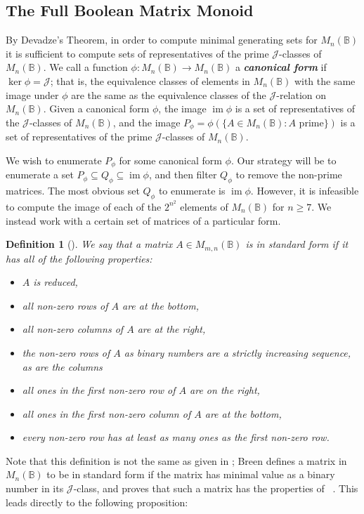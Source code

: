 \documentclass[11pt]{article}
\newtheorem*{defi}{Definition}
\newenvironment{de}[1][]{\begin{defi}[#1]\rm}{\end{defi}}
\newcommand{\defn}[1]{\textbf{\textit{#1}}}
\numberwithin{equation}{section}
\newcommand{\set}[2]{\ensuremath{\{#1 : #2 \}}}
\renewcommand{\to}{\longrightarrow}
\DeclareMathOperator{\im}{im}
\newcommand{\B}{\mathbb{B}}
\newcommand{\Bn}{M_n(\B)}
\newcommand{\Bmn}{M_{m,n}(\B)}
\newcommand{\J}{\mathscr{J}}
\begin{document}
\subsection{The Full Boolean Matrix Monoid}

By Devadze's Theorem, in order to compute minimal generating sets for $\Bn$ it
is sufficient to compute sets of representatives of the prime $\J$-classes of
$\Bn$. We call a function $\phi: \Bn \to \Bn$ a \defn{canonical form} if
$\ker\phi = \J$; that is, the equivalence classes of elements in $\Bn$ with the
same image under $\phi$ are the same as the equivalence classes of the
$\J$-relation on $\Bn$. Given a canonical form $\phi$, the image $\im\phi$ is a
set of representatives of the $\J$-classes of $\Bn$, and the image
$P_\phi = \phi(\set{A \in \Bn}{\text{$A$ prime}})$ is a set of
representatives of the prime $\J$-classes of $\Bn$. 

We wish to enumerate $P_\phi$ for some canonical form $\phi$. Our strategy will
be to enumerate a set $P_\phi \subseteq Q_\phi \subseteq \im\phi$, and then
filter $Q_\phi$ to remove the non-prime matrices.  The most obvious set
$Q_\phi$ to enumerate is $\im\phi$. However, it is infeasible to compute the
image of each of the $2^{n^2}$ elements of $\Bn$ for $n \geq 7$. We instead work
with a certain set of matrices of a particular form. 

\begin{de}[{{\cite[Proposition 3.6]{Breen1997aa}}}]
  We say that a matrix $A \in \Bmn$ is in \emph{standard form} if it has all of
  the following properties:
  \begin{itemize}
  \item{$A$ is reduced,}
  \item{all non-zero rows of $A$ are at the bottom,}
  \item{all non-zero columns of $A$ are at the right,}
  \item{the non-zero rows of $A$ as binary numbers are a strictly increasing
      sequence, as are the columns}
  \item{all ones in the first non-zero row of $A$ are on the right,}
  \item{all ones in the first non-zero column of $A$ are at the bottom,}
  \item{every non-zero row has at least as many ones as the first non-zero row.}
  \end{itemize}
\end{de}
Note that this definition is not the same as given in \cite{Breen1997aa}; Breen
defines a matrix in $\Bn$ to be in standard form if the matrix has minimal value
as a binary number in its $\J$-class, and proves that such a matrix has the
properties of ~\cite[Prop 3.6]{Breen1997aa}. This leads
directly to the following proposition:
\end{document}
